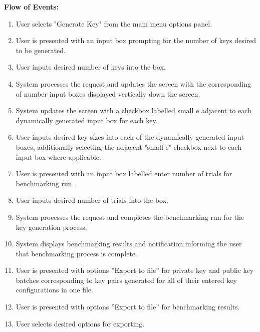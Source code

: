 \documentclass[]{final_report}
\theoremstyle{definition}
\begin{document}
\noindent\textbf{Flow of Events:}
\begin{enumerate}
    \item User selects "Generate Key" from the main menu options panel.
    \item User is presented with an input box prompting for the number of keys desired to be generated.
    \item User inputs desired number of keys into the box.
    \item System processes the request and updates the screen with the corresponding of number input boxes displayed vertically down the screen.
    \item System updates the screen with a checkbox labelled small e adjacent to each dynamically generated input box for each key.
    \item User inputs desired key sizes into each of the dynamically generated input boxes, additionally selecting the adjacent "small e" checkbox next to each input box where applicable.
    \item User is presented with an input box labelled enter number of trials for benchmarking run.
    \item User inputs desired number of trials into the box.
    \item System processes the request and completes the benchmarking run for the key generation process.
      \item System displays benchmarking results and notification informing the user that benchmarking process is complete.
      \item User is presented with options ”Export to file” for private key and public key batches corresponding to key pairs generated for all of their entered key configurations in one file.
        \item User is presented with options ”Export to file” for benchmarking results.
        \item User selects desired options for exporting.
\end{enumerate}
\end{document}
